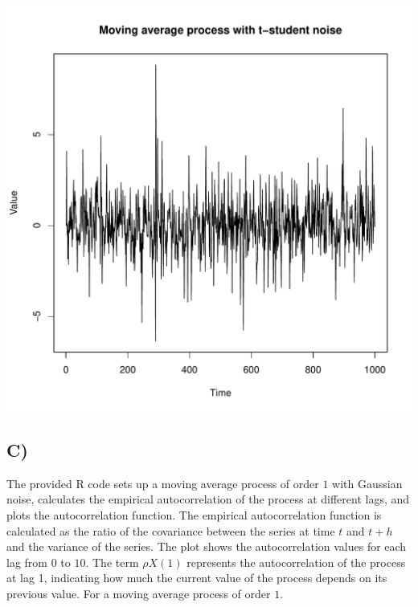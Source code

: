 \documentclass[11pt, letterpaper]{article}
\begin{document}
\begin{center}
	\includegraphics[scale=0.47]{code/q4b}
\end{center}
\newpage
\subsection*{C)}

\begin{file}[q4c.r]
	
\end{file}

The provided R code sets up a moving average process of order $1$ with Gaussian
noise, calculates the empirical autocorrelation of the process at different
lags, and plots the autocorrelation function. The
empirical autocorrelation function is calculated as the ratio of the covariance
between the series at time $t$ and $t + h$ and the variance of the series. The
plot
shows the autocorrelation values for each lag from $0$ to $10$. The term $\rho
	X(1)$
represents the autocorrelation of the process at lag 1, indicating how much the
current value of the process depends on its previous value. For a moving
average process of order $1$.
\end{document}
